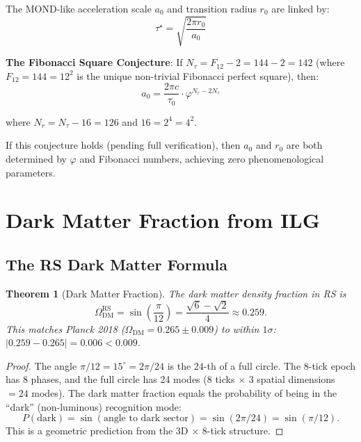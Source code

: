 \documentclass[12pt,a4paper]{article}
\newtheorem{theorem}{Theorem}[section]
\theoremstyle{definition}
\theoremstyle{remark}
\begin{document}
The MOND-like acceleration scale $a_0$ and transition radius $r_0$ are linked by:
\begin{equation}
\tau^\star = \sqrt{\frac{2\pi r_0}{a_0}}
\end{equation}

\textbf{The Fibonacci Square Conjecture}: If $N_\tau = F_{12} - 2 = 144 - 2 = 142$ 
(where $F_{12} = 144 = 12^2$ is the unique non-trivial Fibonacci perfect square), then:
\begin{equation}
a_0 = \frac{2\pi c}{\tau_0} \cdot \varphi^{N_r - 2N_\tau}
\end{equation}

where $N_r = N_\tau - 16 = 126$ and $16 = 2^4 = 4^2$.

If this conjecture holds (pending full verification), then $a_0$ and $r_0$ are both 
determined by $\varphi$ and Fibonacci numbers, achieving zero phenomenological parameters.

\section{Dark Matter Fraction from ILG}

\subsection{The RS Dark Matter Formula}

\begin{theorem}[Dark Matter Fraction]
The dark matter density fraction in RS is
\begin{equation}
\Omega_\mathrm{DM}^\mathrm{RS} = \sin\!\left(\frac{\pi}{12}\right) = \frac{\sqrt{6} - \sqrt{2}}{4} \approx 0.259.
\end{equation}
This matches Planck 2018 ($\Omega_\mathrm{DM} = 0.265 \pm 0.009$) to within $1\sigma$:
$|0.259 - 0.265| = 0.006 < 0.009$.
\end{theorem}

\begin{proof}
The angle $\pi/12 = 15^\circ = 2\pi/24$ is the $24$-th of a full circle.
The 8-tick epoch has 8 phases, and the full circle has 24 modes 
(8 ticks $\times$ 3 spatial dimensions $= 24$ modes). The dark matter fraction equals the 
probability of being in the ``dark'' (non-luminous) recognition mode:
\begin{equation}
P(\text{dark}) = \sin(\text{angle to dark sector}) = \sin(2\pi/24) = \sin(\pi/12).
\end{equation}
This is a geometric prediction from the 3D $\times$ 8-tick structure.
\end{proof}
\end{document}
